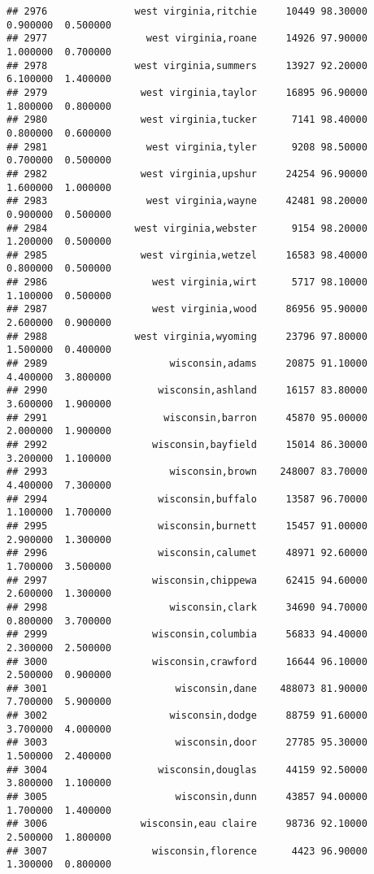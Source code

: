 \documentclass[
]{article}
\begin{document}
\begin{verbatim}
## 2976               west virginia,ritchie     10449 98.30000  0.900000  0.500000
## 2977                 west virginia,roane     14926 97.90000  1.000000  0.700000
## 2978               west virginia,summers     13927 92.20000  6.100000  1.400000
## 2979                west virginia,taylor     16895 96.90000  1.800000  0.800000
## 2980                west virginia,tucker      7141 98.40000  0.800000  0.600000
## 2981                 west virginia,tyler      9208 98.50000  0.700000  0.500000
## 2982                west virginia,upshur     24254 96.90000  1.600000  1.000000
## 2983                 west virginia,wayne     42481 98.20000  0.900000  0.500000
## 2984               west virginia,webster      9154 98.20000  1.200000  0.500000
## 2985                west virginia,wetzel     16583 98.40000  0.800000  0.500000
## 2986                  west virginia,wirt      5717 98.10000  1.100000  0.500000
## 2987                  west virginia,wood     86956 95.90000  2.600000  0.900000
## 2988               west virginia,wyoming     23796 97.80000  1.500000  0.400000
## 2989                     wisconsin,adams     20875 91.10000  4.400000  3.800000
## 2990                   wisconsin,ashland     16157 83.80000  3.600000  1.900000
## 2991                    wisconsin,barron     45870 95.00000  2.000000  1.900000
## 2992                  wisconsin,bayfield     15014 86.30000  3.200000  1.100000
## 2993                     wisconsin,brown    248007 83.70000  4.400000  7.300000
## 2994                   wisconsin,buffalo     13587 96.70000  1.100000  1.700000
## 2995                   wisconsin,burnett     15457 91.00000  2.900000  1.300000
## 2996                   wisconsin,calumet     48971 92.60000  1.700000  3.500000
## 2997                  wisconsin,chippewa     62415 94.60000  2.600000  1.300000
## 2998                     wisconsin,clark     34690 94.70000  0.800000  3.700000
## 2999                  wisconsin,columbia     56833 94.40000  2.300000  2.500000
## 3000                  wisconsin,crawford     16644 96.10000  2.500000  0.900000
## 3001                      wisconsin,dane    488073 81.90000  7.700000  5.900000
## 3002                     wisconsin,dodge     88759 91.60000  3.700000  4.000000
## 3003                      wisconsin,door     27785 95.30000  1.500000  2.400000
## 3004                   wisconsin,douglas     44159 92.50000  3.800000  1.100000
## 3005                      wisconsin,dunn     43857 94.00000  1.700000  1.400000
## 3006                wisconsin,eau claire     98736 92.10000  2.500000  1.800000
## 3007                  wisconsin,florence      4423 96.90000  1.300000  0.800000

\end{verbatim}
\end{document}
